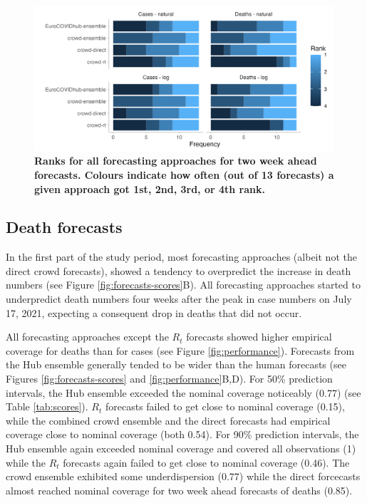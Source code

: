 \documentclass[10pt,a4paper,twocolumn]{article}
\begin{document}
\begin{figure}
\centering
\includegraphics[width=0.99\textwidth]{../output/figures/performance-ranks.png}
\caption{\bf{Ranks for all forecasting approaches for two week ahead forecasts}. Colours indicate how often (out of 13 forecasts) a given approach got 1st, 2nd, 3rd, or 4th rank.}
\label{fig:performance-ranks}
\end{figure}

\subsection*{Death forecasts} 

In the first part of the study period, most forecasting approaches (albeit not the direct crowd forecasts), showed a tendency to overpredict the increase in death numbers (see Figure \ref{fig:forecasts-scores}B). All forecasting approaches started to underpredict death numbers four weeks after the peak in case numbers on July 17, 2021, expecting a consequent drop in deaths that did not occur.

All forecasting approaches except the $R_t$ forecasts showed higher empirical coverage for deaths than for cases (see Figure \ref{fig:performance}). Forecasts from the Hub ensemble generally tended to be wider than the human forecasts (see Figures \ref{fig:forecasts-scores} and \ref{fig:performance}B,D). For 50\% prediction intervals, the Hub ensemble exceeded the nominal coverage noticeably (0.77) (see Table \ref{tab:scores}). $R_t$ forecasts failed to get close to nominal coverage (0.15), while the combined crowd ensemble and the direct forecasts had empirical coverage close to nominal coverage (both 0.54). For 90\% prediction intervals, the Hub ensemble again exceeded nominal coverage and covered all observations (1) while the $R_t$ forecasts again failed to get close to nominal coverage (0.46). The crowd ensemble exhibited some underdispersion (0.77) while the direct forcecasts almost reached nominal coverage for two week ahead forecasts of deaths (0.85). 
\end{document}

